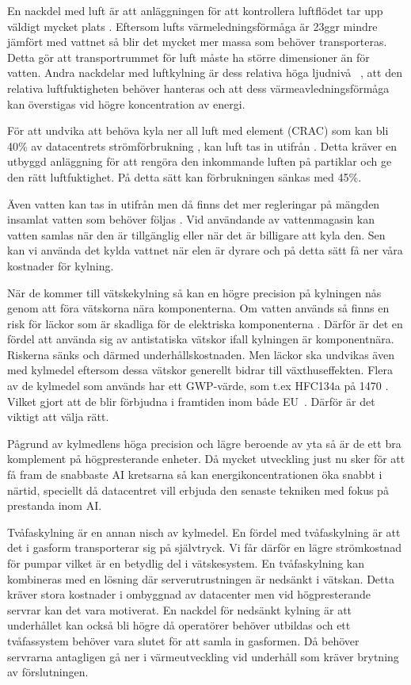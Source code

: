 \documentclass[conference,a4paper]{IEEEtran}
\begin{document}
En nackdel med luft är att anläggningen för att kontrollera luftflödet tar upp väldigt mycket plats \cite{modelling2}. Eftersom lufts värmeledningsförmåga 
är 23ggr mindre jämfört med vattnet \cite{thermalconduct} så blir det mycket mer massa som behöver transporteras. Detta gör att transportrummet för luft måste ha större dimensioner än för vatten.
Andra nackdelar med luftkylning är dess relativa höga ljudnivå ~\cite{immersioncooling1}, att den relativa luftfuktigheten behöver hanteras och att dess värmeavledningsförmåga
kan överstigas vid högre koncentration av energi.

För att undvika att behöva kyla ner all luft med element (CRAC) \cite{energy3} som kan bli 40\% av datacentrets strömförbrukning \cite{heatexchange1}, kan luft 
tas in utifrån \cite{free-cooling2}. Detta kräver en utbyggd anläggning för att rengöra den inkommande luften på partiklar och ge den rätt luftfuktighet. 
På detta sätt kan förbrukningen sänkas med 45\%.

Även vatten kan tas in utifrån men då finns det mer regleringar på mängden insamlat vatten som behöver följas \cite{liqcool2}. Vid användande av vattenmagasin kan vatten 
samlas när den är tillgänglig eller när det är billigare att kyla den. Sen kan vi använda det kylda vattnet när elen är dyrare och på detta sätt
få ner våra kostnader för kylning.

När de kommer till vätskekylning så kan en högre precision på kylningen nås \cite{energycompare2} genom att föra vätskorna nära komponenterna. Om vatten används så finns en risk  
för läckor som är skadliga för de elektriska komponenterna \cite{liqcool1}. Därför är det en fördel att använda sig av antistatiska vätskor ifall kylningen är komponentnära. 
Riskerna sänks och därmed underhållskostnaden. Men läckor ska undvikas även med kylmedel eftersom dessa vätskor  generellt bidrar till växthuseffekten. Flera av de kylmedel 
som används har ett GWP-värde, som t.ex HFC134a på 1470 \cite{GWP1}. Vilket gjort att de blir förbjudna i framtiden inom både EU~\cite{EUphase}. Därför är det viktigt att välja rätt. 

Pågrund av kylmedlens höga precision och lägre beroende av yta så är de ett bra komplement på högpresterande enheter. Då mycket utveckling just nu sker för att 
få fram de snabbaste AI kretsarna så kan energikoncentrationen öka snabbt i närtid, speciellt då datacentret vill erbjuda den senaste tekniken med fokus på prestanda inom AI. 

Tvåfaskylning är en annan nisch av kylmedel. En fördel med tvåfaskylning är att det i gasform transporterar sig på självtryck. Vi får därför en lägre 
strömkostnad för pumpar vilket är en betydlig del i vätskesystem. En tvåfaskylning kan kombineras med en lösning där serverutrustningen är nedsänkt i 
vätskan. Detta kräver stora kostnader \cite{liqcool2} i ombyggnad av datacenter men vid högpresterande servrar kan det vara motiverat. 
En nackdel för nedsänkt kylning är att underhållet kan också bli högre då operatörer behöver utbildas och ett tvåfassystem 
behöver vara slutet för att samla in gasformen. Då behöver servrarna antagligen gå ner i värmeutveckling vid underhåll som kräver brytning av förslutningen.  
\end{document}
